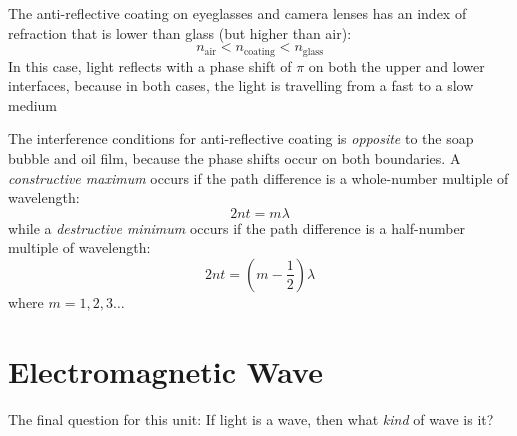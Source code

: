 The anti-reflective coating on eyeglasses and camera lenses has an index of
refraction that is lower than glass (but higher than air):
\begin{equation}
  n_\text{air}<n_\text{coating}<n_\text{glass}
\end{equation}
In this case, light reflects with a phase shift of $\pi$ on both the upper and
lower interfaces, because in both cases, the light is travelling from a fast to
a slow medium

The interference conditions for anti-reflective coating is \emph{opposite}
to the soap bubble and oil film, because the phase shifts occur on both
boundaries. A \emph{constructive maximum} occurs if the path difference is a
whole-number multiple of wavelength:
\begin{equation}
  \boxed{
    2nt=m\lambda
  }
\end{equation}
while a \emph{destructive minimum} occurs if the path difference is a
half-number multiple of wavelength:
\begin{equation}
  \boxed{
    2nt=\left(m-\frac12\right)\lambda
  }
\end{equation}
where $m=1,2,3\ldots$



\chapter{Electromagnetic Wave}

The final question for this unit: If light is a wave, then what \emph{kind} of
wave is it?
%
%
%
%
%    
%
%
%
%
